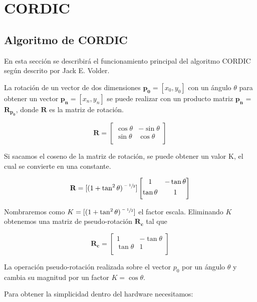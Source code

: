 \chapter{CORDIC}
\section{Algoritmo de CORDIC}

En esta sección se describirá el funcionamiento principal del algoritmo CORDIC según descrito por Jack E. Volder.

La rotación de un vector de dos dimensiones $\boldsymbol{p_{0}} = [x_{0},y_{0}]$ con un ángulo $\theta$ para obtener un vector $\boldsymbol{p_{n}} = [x_{n},y_{n}]$ se puede realizar con un producto matriz $\boldsymbol{p_{n}}$ = $\boldsymbol{R_{p_{0}}}$, donde $\textbf{R}$ es la matriz de rotación.

\[ \textbf{R} = \begin{bmatrix}
\cos{\theta} & -\sin{\theta} 	\\[0.3em]
\sin{\theta}  & \cos{\theta} 			\\[0.3em]
\end{bmatrix} \]

Si sacamos el coseno de la matriz de rotación, se puede obtener un valor K, el cual se convierte en una constante.

\[ \textbf{R} = [(1 + \tan^2{\theta})^{\sfrac{-1}{2}}] \begin{bmatrix}
1 & -\tan{\theta} 	\\[0.3em]
\tan{\theta}  & 1 			\\[0.3em]
\end{bmatrix} \]

Nombraremos como $K = [(1 + \tan^2{\theta})^{\sfrac{-1}{2}}]$ el factor escala. Eliminando $K$ obtenemos una matriz de pseudo-rotación $\boldsymbol{R_{c}}$ tal que

\[ \boldsymbol{R_{c}} = \begin{bmatrix}
1 & -\tan{\theta} 	\\[0.3em]
\tan{\theta}  & 1 			\\[0.3em]
\end{bmatrix} \]

La operación pseudo-rotación realizada sobre el vector $p_{0}$ por un ángulo $\theta$ y cambia su magnitud por un factor $K = \cos{\theta}$.

Para obtener la simplicidad dentro del hardware necesitamos:


